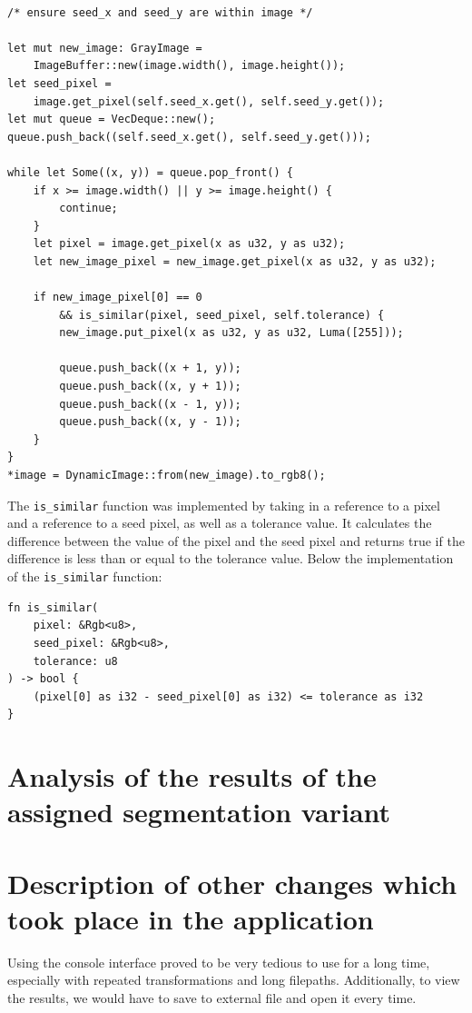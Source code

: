 \documentclass[12pt]{article}
\begin{document}
\begin{lstlisting}
    
/* ensure seed_x and seed_y are within image */

let mut new_image: GrayImage = 
    ImageBuffer::new(image.width(), image.height());
let seed_pixel = 
    image.get_pixel(self.seed_x.get(), self.seed_y.get());
let mut queue = VecDeque::new();
queue.push_back((self.seed_x.get(), self.seed_y.get()));

while let Some((x, y)) = queue.pop_front() {
    if x >= image.width() || y >= image.height() {
        continue;
    }
    let pixel = image.get_pixel(x as u32, y as u32);
    let new_image_pixel = new_image.get_pixel(x as u32, y as u32);

    if new_image_pixel[0] == 0 
        && is_similar(pixel, seed_pixel, self.tolerance) {
        new_image.put_pixel(x as u32, y as u32, Luma([255]));

        queue.push_back((x + 1, y));
        queue.push_back((x, y + 1));
        queue.push_back((x - 1, y));
        queue.push_back((x, y - 1));
    }
}
*image = DynamicImage::from(new_image).to_rgb8();
\end{lstlisting}

The \lstinline{is_similar} function was implemented by taking in a reference to a pixel
and a reference to a seed pixel,
as well as a tolerance value.
It calculates the difference between the value of the pixel
and the seed pixel and returns true if the difference is less than or equal
to the tolerance value. Below the implementation of the \lstinline{is_similar} function:

\begin{lstlisting}
fn is_similar(
    pixel: &Rgb<u8>, 
    seed_pixel: &Rgb<u8>, 
    tolerance: u8
) -> bool {
    (pixel[0] as i32 - seed_pixel[0] as i32) <= tolerance as i32
}
\end{lstlisting}

\section{Analysis of the results of the assigned segmentation variant}
\section{Description of other changes which took place in the application}

Using the console interface proved to be very tedious to use for a long time,
especially with repeated transformations and long filepaths.
Additionally, to view the results, we would have to save to external file and open it every time.
\end{document}
